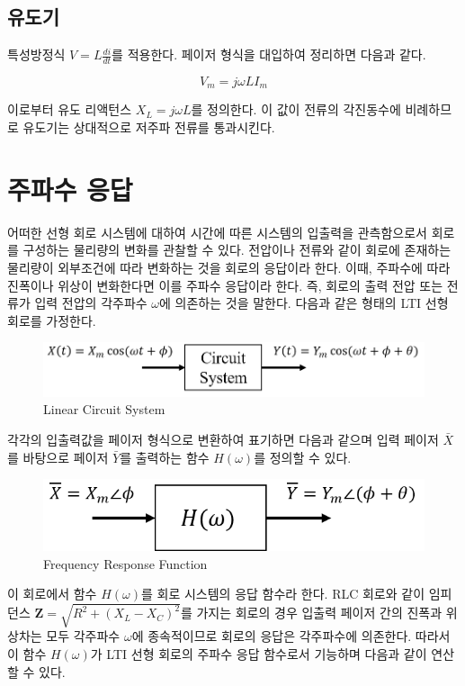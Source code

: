\documentclass{article}
\begin{document}
\subsection{유도기}
특성방정식 $V=L\frac{di}{dt}$를 적용한다. 페이저 형식을 대입하여 정리하면 다음과 같다.

\begin{equation}
    V_m=j\omega LI_m
\end{equation}

이로부터 유도 리액턴스 $X_L=j\omega L$를 정의한다. 이 값이 전류의 각진동수에 비례하므로 유도기는 상대적으로 저주파 전류를 통과시킨다.


\section{주파수 응답}
어떠한 선형 회로 시스템에 대하여 시간에 따른 시스템의 입출력을 관측함으로서 회로를 구성하는 물리량의 변화를 관찰할 수 있다. 전압이나 전류와 같이 회로에 존재하는 물리량이 외부조건에 따라 변화하는 것을 회로의 응답이라 한다. 이때, 주파수에 따라 진폭이나 위상이 변화한다면 이를 주파수 응답이라 한다. 즉, 회로의 출력 전압 또는 전류가 입력 전압의 각주파수 $\omega$에 의존하는 것을 말한다. 다음과 같은 형태의 LTI 선형 회로를 가정한다.

\begin{figure}[h]
    \centering
    \includegraphics[scale=0.6]{./Linear Circuit System.png}
    \caption{Linear Circuit System}
\end{figure}

각각의 입출력값을 페이저 형식으로 변환하여 표기하면 다음과 같으며 입력 페이저 $\bar{X}$를 바탕으로 페이저 $\bar{Y}$를 출력하는 함수 $H(\omega)$를 정의할 수 있다.

\begin{figure}[h]
    \centering
    \includegraphics[scale=0.6]{./Frequency Response Function.png}
    \caption{Frequency Response Function}
\end{figure}

이 회로에서 함수 $H(\omega)$를 회로 시스템의 응답 함수라 한다. RLC 회로와 같이 임피던스 $\boldsymbol{Z}=\sqrt{R^2+(X_L-X_C)^2}$를 가지는 회로의 경우 입출력 페이저 간의 진폭과 위상차는 모두 각주파수 $\omega$에 종속적이므로 회로의 응답은 각주파수에 의존한다. 따라서 이 함수 $H(\omega)$가 LTI 선형 회로의 주파수 응답 함수로서 기능하며 다음과 같이 연산할 수 있다.
\end{document}
